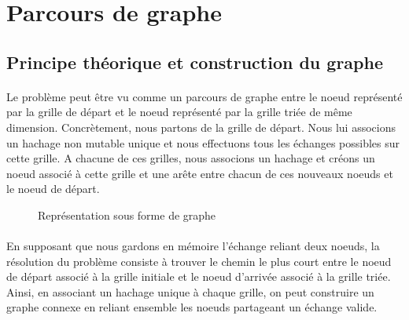 \documentclass[12pt]{article}
\begin{document}
\section{Parcours de graphe}
\subsection{Principe théorique et construction du graphe}
\paragraph{}
Le problème peut être vu comme un parcours de graphe entre le noeud représenté par la grille de départ et le noeud représenté par la grille triée de même dimension. Concrètement, nous partons de la grille de départ. Nous lui associons un hachage non mutable unique et nous effectuons tous les échanges possibles sur cette grille. A chacune de ces grilles, nous associons un hachage et créons un noeud associé à cette grille et une arête entre chacun de ces nouveaux noeuds et le noeud de départ. 

\begin{figure}[h]
    \centering
    \caption{Représentation sous forme de graphe}
    \label{fig:enter-label}
\end{figure}

\paragraph{}
En supposant que nous gardons en mémoire l'échange reliant deux noeuds, la résolution du problème consiste à trouver le chemin le plus court entre le noeud de départ associé à la grille initiale et le noeud d'arrivée associé à la grille triée. \\
Ainsi, en associant un hachage unique à chaque grille, on peut construire un graphe connexe en reliant ensemble les noeuds partageant un échange valide.
\end{document}
